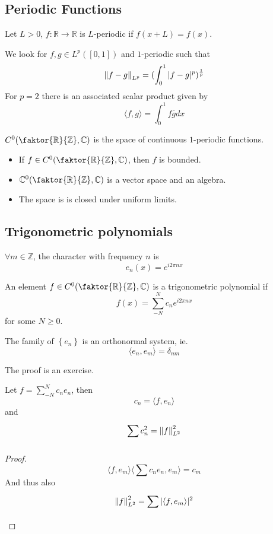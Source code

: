 \documentclass[../main.tex]{subfiles}
\begin{document}
\subsection{Periodic Functions}
\begin{defn}
	Let $L>0$, $f: \mathbb{R}\to \mathbb{R}$ is $L$-periodic if $f( x+L ) = f( x) $.
\end{defn}
We look for $f,g\in L^{p}( [ 0,1] ) $ and $1$-periodic such that
\[ 
	\left\lVert f-g\right\rVert_{L^{p}} = ( \int_{ 0 }^{ 1 }|f-g|^{p}) ^{\frac{1}{p}}
\]
For $p=2$ there is an associated scalar product given by
\[ 
\langle f,g\rangle = \int_{ 0 }^{ 1 } f \overline{g} dx
\]
\begin{defn}
	$C^{0}(  \faktor { \mathbb{R}} { \mathbb{Z}} , \mathbb{C}) $ is the space of continuous $1$-periodic functions.
\end{defn}
\begin{lemma}
\begin{itemize}
\item If $f\in C^{0}( \faktor { \mathbb{R}} { \mathbb{Z}} , \mathbb{C}) $, then $f$ is bounded.
\item $ \mathbb{C}^{0}( \faktor { \mathbb{R}} { \mathbb{Z}} , \mathbb{C}) $ is a vector space and an algebra.
\item The space is is closed under uniform limits.
\end{itemize}
\end{lemma}
\subsection{Trigonometric polynomials}
\begin{defn}
	$\forall m\in \mathbb{Z}$, the character with frequency $n$ is
	\[ 
	e_n( x) = e^{i 2 \pi n x } 
	\]
\end{defn}
\begin{defn}
	An element $f\in C^{0}( \faktor { \mathbb{R}} { \mathbb{Z}} , \mathbb{C}) $ is a trigonometric polynomial if
	\[ 
	f( x) = \sum_{-N}^{ N} c_n e^{i 2\pi n x } 
	\]
	for some $N \geq 0$.
\end{defn}
\begin{lemma}
	The family of $ \left\{ e_n \right\} $ is an orthonormal system, ie.
	\[ 
	\langle e_n, e_m \rangle  =  \delta_{nm} 
	\]
	
\end{lemma}
The proof is an exercise.
\begin{crly}
Let $f= \sum_{-N}^{ N}c_n e_n$, then
\[ 
c_n = \langle f, e_n\rangle
\]
and 
\[ 
\sum_{}^{ } c_n^{2} = \left\lVert f\right\rVert_{L^{2}} ^{2}
\]


\end{crly}
\begin{proof}
\[ 
\langle f, e_m\rangle \langle \sum c_n e_n, e_m\rangle = c_m
\]
And thus also
\[ 
\left\lVert f\right\rVert _{L^{2}} ^{2} = \sum_{}^{ } |\langle f, e_m\rangle|^{2} 
\]


\end{proof}
\end{document}
